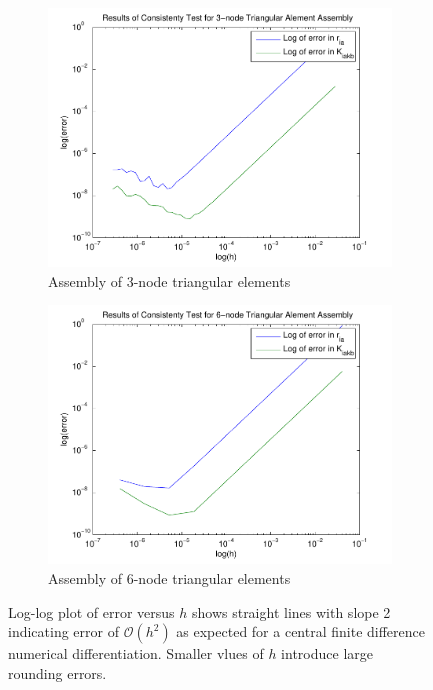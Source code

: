 \documentclass[../main.tex]{subfiles}
\begin{document}
\begin{figure}[ht]
  \centering
  \begin{subfigure}[b]{0.5\textwidth}
    \includegraphics[scale=0.5]{./img/T3AssyConsistency.pdf}
    \caption{Assembly of 3-node triangular elements}
    \label{fig:linAssyCon}
  \end{subfigure}%
  \begin{subfigure}[b]{0.5\textwidth}
    \includegraphics[scale=0.5]{./img/T6AssyConsistency.pdf}
    \caption{Assembly of 6-node triangular elements}
    \label{fig:quadAssyCon}
  \end{subfigure}
  \caption{Log-log plot of error versus $h$ shows straight lines with
    slope 2 indicating error of $\mathcal{O}(h^2)$ as expected for a
    central finite difference numerical differentiation. Smaller vlues
    of $h$ introduce large rounding errors.}
  \label{fig:assyConsistency}
\end{figure}
\end{document}
